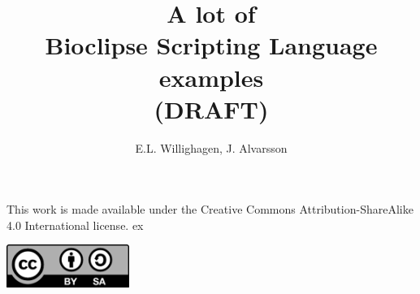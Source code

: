 \documentclass[a5paper, 10pt]{memoir}
\title{A lot of \\ Bioclipse Scripting Language \\ examples \\ (DRAFT)}
\author{E.L. Willighagen, J. Alvarsson}
\begin{document}
\maketitle

\newpage

\mbox{}\vfill
{\noindent \textsf{This work is made available under the Creative Commons
Attribution-ShareAlike 4.0 International license.}}
 ex
\begin{center}
	\includegraphics[width=0.3\textwidth]{ccbysa.png}
\end{center}
\vfill
\newpage

\tableofcontents
\end{document}
